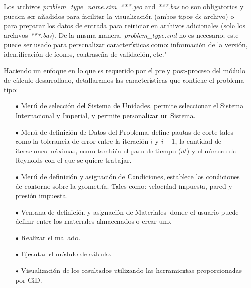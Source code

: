 \documentclass[a4paper,10pt, oneside]{book}
\begin{document}
Los archivos \textit{problem\_{}type\_{}name.sim}, \textit{***.geo} and \textit{***.bas} no son obligatorios y pueden ser añadidos para facilitar la visualización (ambos tipos de archivo) o para preparar los datos de entrada para reiniciar en archivos adicionales (solo los archivos \textit{***.bas}). De la misma manera, \textit{problem\_{}type.xml} no es necesario; este puede ser usado para personalizar características como: información de la versión, identificación de íconos, contraseña de validación, etc." \cite{GiD}

Haciendo un enfoque en lo que es requerido por el pre y post-proceso del módulo de cálculo desarrollado, detallaremos las características que contiene el problema tipo:
\begin{itemize}
  \item[$\bullet$] Menú de selección del Sistema de Unidades, permite seleccionar el Sistema Internacional y Imperial, y permite personalizar un Sistema.
  \item[$\bullet$] Menú de definición de Datos del Problema, define pautas de corte tales como la tolerancia de error entre la iteración $i$ y $i-1$, la cantidad de iteraciones máximas, como también el paso de tiempo ($dt$) y el número de Reynolds con el que se quiere trabajar.
  \item[$\bullet$] Menú de definición y asignación de Condiciones, establece las condiciones de contorno sobre la geometría. Tales como: velocidad impuesta, pared y presión impuesta.
  \item[$\bullet$] Ventana de definición y asignación de Materiales, donde el usuario puede definir entre los materiales almacenados o crear uno.
  \item[$\bullet$] Realizar el mallado.
  \item[$\bullet$] Ejecutar el módulo de cálculo.
  \item[$\bullet$] Visualización de los resultados utilizando las herramientas proporcionadas por GiD.
\end{itemize}
\end{document}
